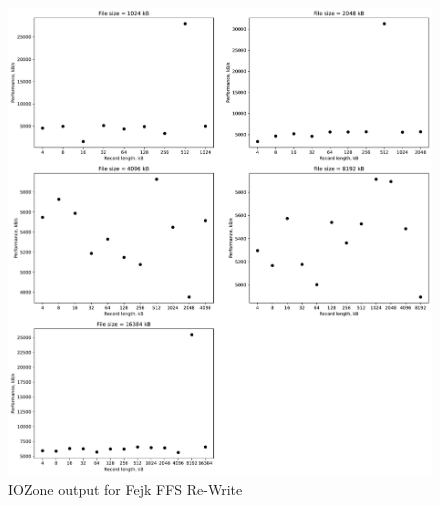 \begin{figure}[!htb]
	\label{fig:app_bench_fffs_re_write}
	\begin{center}
		\includegraphics[width=1.0\textwidth]{figures/benchmarking/fejk-ffs/Re-Write.pdf}
	\end{center}
	\caption{IOZone output for Fejk FFS \mbox{Re-Write}}
\end{figure}

